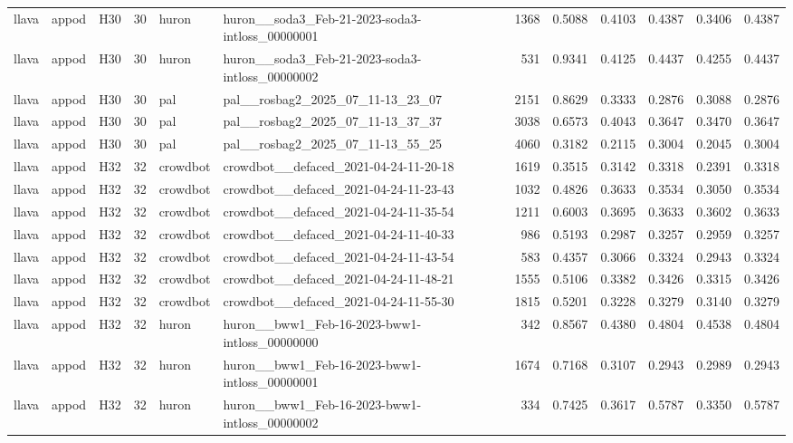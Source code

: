 \begin{table}[tbp]
\begin{tabular}{lllrllrrrrrr}
llava & appod & H30 & 30 & huron & huron\_\_soda3\_Feb-21-2023-soda3-intloss\_00000001 & 1368 & 0.5088 & 0.4103 & 0.4387 & 0.3406 & 0.4387 \\
llava & appod & H30 & 30 & huron & huron\_\_soda3\_Feb-21-2023-soda3-intloss\_00000002 & 531 & 0.9341 & 0.4125 & 0.4437 & 0.4255 & 0.4437 \\
llava & appod & H30 & 30 & pal & pal\_\_rosbag2\_2025\_07\_11-13\_23\_07 & 2151 & 0.8629 & 0.3333 & 0.2876 & 0.3088 & 0.2876 \\
llava & appod & H30 & 30 & pal & pal\_\_rosbag2\_2025\_07\_11-13\_37\_37 & 3038 & 0.6573 & 0.4043 & 0.3647 & 0.3470 & 0.3647 \\
llava & appod & H30 & 30 & pal & pal\_\_rosbag2\_2025\_07\_11-13\_55\_25 & 4060 & 0.3182 & 0.2115 & 0.3004 & 0.2045 & 0.3004 \\
llava & appod & H32 & 32 & crowdbot & crowdbot\_\_defaced\_2021-04-24-11-20-18 & 1619 & 0.3515 & 0.3142 & 0.3318 & 0.2391 & 0.3318 \\
llava & appod & H32 & 32 & crowdbot & crowdbot\_\_defaced\_2021-04-24-11-23-43 & 1032 & 0.4826 & 0.3633 & 0.3534 & 0.3050 & 0.3534 \\
llava & appod & H32 & 32 & crowdbot & crowdbot\_\_defaced\_2021-04-24-11-35-54 & 1211 & 0.6003 & 0.3695 & 0.3633 & 0.3602 & 0.3633 \\
llava & appod & H32 & 32 & crowdbot & crowdbot\_\_defaced\_2021-04-24-11-40-33 & 986 & 0.5193 & 0.2987 & 0.3257 & 0.2959 & 0.3257 \\
llava & appod & H32 & 32 & crowdbot & crowdbot\_\_defaced\_2021-04-24-11-43-54 & 583 & 0.4357 & 0.3066 & 0.3324 & 0.2943 & 0.3324 \\
llava & appod & H32 & 32 & crowdbot & crowdbot\_\_defaced\_2021-04-24-11-48-21 & 1555 & 0.5106 & 0.3382 & 0.3426 & 0.3315 & 0.3426 \\
llava & appod & H32 & 32 & crowdbot & crowdbot\_\_defaced\_2021-04-24-11-55-30 & 1815 & 0.5201 & 0.3228 & 0.3279 & 0.3140 & 0.3279 \\
llava & appod & H32 & 32 & huron & huron\_\_bww1\_Feb-16-2023-bww1-intloss\_00000000 & 342 & 0.8567 & 0.4380 & 0.4804 & 0.4538 & 0.4804 \\
llava & appod & H32 & 32 & huron & huron\_\_bww1\_Feb-16-2023-bww1-intloss\_00000001 & 1674 & 0.7168 & 0.3107 & 0.2943 & 0.2989 & 0.2943 \\
llava & appod & H32 & 32 & huron & huron\_\_bww1\_Feb-16-2023-bww1-intloss\_00000002 & 334 & 0.7425 & 0.3617 & 0.5787 & 0.3350 & 0.5787 \\

\end{tabular}
\end{table}
